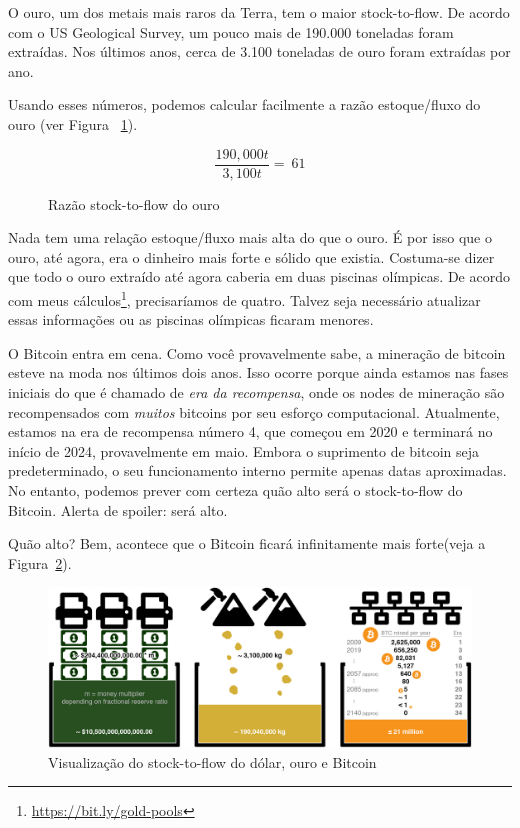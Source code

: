 O ouro, um dos metais mais raros da Terra, tem o maior stock-to-flow. De acordo com o US Geological Survey, um pouco mais de 190.000 toneladas foram extraídas. Nos últimos anos, cerca de 3.100 toneladas de ouro foram extraídas por ano.~\cite{mineral-commodity-summaries}

Usando esses números, podemos calcular facilmente a razão estoque/fluxo do ouro (ver Figura ~\ref{fig:stock-to-flow-gold}).

\begin{figure}
  \centering
  \begin{equation}
  \frac{190,000 t}{3,100 t} = ~ 61
  \end{equation}
  \caption{Razão stock-to-flow do ouro}
  \label{fig:stock-to-flow-gold}
\end{figure}

Nada tem uma relação estoque/fluxo mais alta do que o ouro. É por isso que o ouro, até agora, era o dinheiro mais forte e sólido que existia. Costuma-se dizer que todo o ouro extraído até agora caberia em duas piscinas olímpicas. De acordo com meus cálculos\footnote{\url{https://bit.ly/gold-pools}}, precisaríamos de quatro. Talvez seja necessário atualizar essas informações ou as piscinas olímpicas ficaram menores.

O Bitcoin entra em cena. Como você provavelmente sabe, a mineração de bitcoin esteve na moda nos últimos dois anos. Isso ocorre porque ainda estamos nas fases iniciais do que é chamado de \textit{era da recompensa}, onde os nodes de mineração são recompensados com \textit{muitos} bitcoins por seu esforço computacional. Atualmente, estamos na era de recompensa número 4, que começou em 2020 e terminará no início de 2024, provavelmente em maio. Embora o suprimento de bitcoin seja predeterminado, o seu funcionamento interno permite apenas datas aproximadas. No entanto, podemos prever com certeza quão alto será o stock-to-flow do Bitcoin. Alerta de spoiler: será alto.

Quão alto? Bem, acontece que o Bitcoin ficará infinitamente mais forte(veja a Figura~\ref{fig:stock-to-flow-white-cropped}).

\begin{figure}
  \includegraphics{assets/images/stock-to-flow-white-cropped.png}
  \caption{Visualização do stock-to-flow do dólar, ouro e Bitcoin}
  \label{fig:stock-to-flow-white-cropped}
\end{figure}

